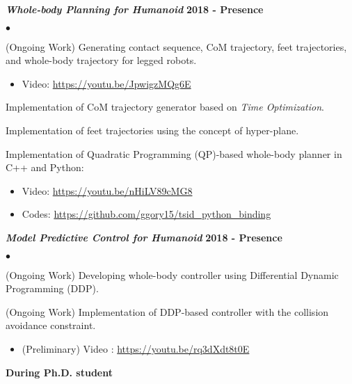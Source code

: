\documentclass[margin,line]{res}
\newenvironment{list2}{
  \begin{list}{$\bullet$}{%
      \setlength{\itemsep}{0in}
      \setlength{\parsep}{0in} \setlength{\parskip}{0in}
      \setlength{\topsep}{0in} \setlength{\partopsep}{0in} 
      \setlength{\leftmargin}{0.2in}}}{\end{list}}
\begin{document}
\begin{resume}
\vspace{-.3cm}
\textbf{\emph {Whole-body Planning for Humanoid}} \hfill {\bf 2018 - Presence}
\begin{list2}
\item (Ongoing Work) Generating contact sequence, CoM trajectory, feet trajectories, and whole-body trajectory for legged robots. 
\begin{itemize}
\vspace*{-.05in}
\item[\checkmark] Video: \url{https://youtu.be/JpwigzMQg6E}
\vspace*{-.05in}
\end{itemize}
\item Implementation of CoM trajectory generator based on \textit{Time Optimization}.
\item Implementation of feet trajectories using the concept of hyper-plane.
\item Implementation of Quadratic Programming (QP)-based whole-body planner in C++ and Python: 
\begin{itemize}
\vspace*{-.05in}
\item[\checkmark] Video: \url{https://youtu.be/nHiLV89cMG8}
\vspace*{-.05in}
\item[\checkmark] Codes: \url{https://github.com/ggory15/tsid_python_binding}
\vspace*{-.05in}
\end{itemize}
\end{list2}

\textbf{\emph { Model Predictive Control for Humanoid}} \hfill {\bf 2018 - Presence}
\begin{list2}
\item (Ongoing Work) Developing whole-body controller using Differential Dynamic Programming (DDP).
\item (Ongoing Work) Implementation of DDP-based controller with the collision avoidance constraint.
\begin{itemize}
\vspace*{-.05in}
\item[\checkmark] (Preliminary) Video : \url{https://youtu.be/rq3dXdt8t0E}
\vspace*{-.05in}
\end{itemize}
\end{list2}


{\bf During Ph.D. student}
 

\end{resume}
\end{document}
